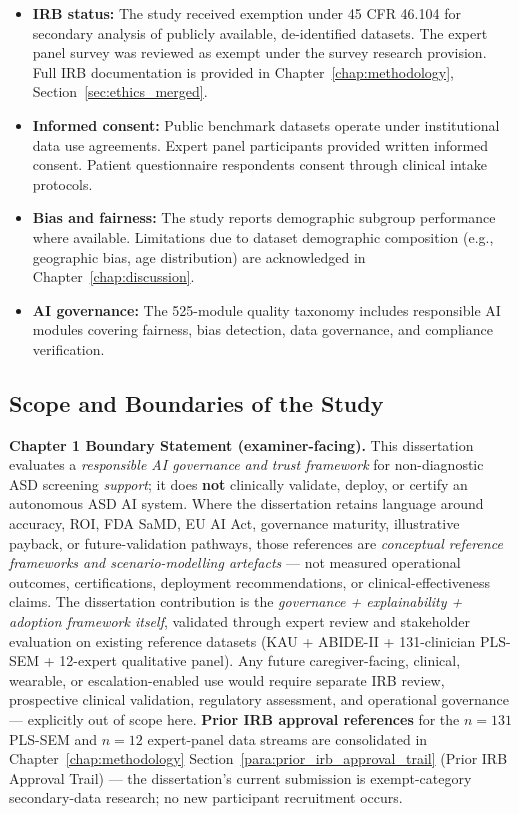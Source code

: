 \begin{itemize}[leftmargin=*, itemsep=3pt]
    \item \textbf{IRB status:} The study received exemption under 45 CFR 46.104 for secondary analysis of publicly available, de-identified datasets. The expert panel survey was reviewed as exempt under the survey research provision. Full IRB documentation is provided in Chapter~\ref{chap:methodology}, Section~\ref{sec:ethics_merged}.
    \item \textbf{Informed consent:} Public benchmark datasets operate under institutional data use agreements. Expert panel participants provided written informed consent. Patient questionnaire respondents consent through clinical intake protocols.
    \item \textbf{Bias and fairness:} The study reports demographic subgroup performance where available. Limitations due to dataset demographic composition (e.g., geographic bias, age distribution) are acknowledged in Chapter~\ref{chap:discussion}.
    \item \textbf{AI governance:} The 525-module quality taxonomy includes responsible AI modules covering fairness, bias detection, data governance, and compliance verification.
\end{itemize}

\subsection{Scope and Boundaries of the Study}
\label{sec:scope_boundaries}

\noindent\textbf{Chapter 1 Boundary Statement (examiner-facing).}
\label{para:ch1_boundary_statement}
This dissertation evaluates a \emph{responsible AI governance and trust framework} for non-diagnostic ASD screening \emph{support}; it does \textbf{not} clinically validate, deploy, or certify an autonomous ASD AI system. Where the dissertation retains language around accuracy, ROI, FDA SaMD, EU AI Act, governance maturity, illustrative payback, or future-validation pathways, those references are \emph{conceptual reference frameworks and scenario-modelling artefacts} --- not measured operational outcomes, certifications, deployment recommendations, or clinical-effectiveness claims. The dissertation contribution is the \emph{governance + explainability + adoption framework itself}, validated through expert review and stakeholder evaluation on existing reference datasets (KAU + ABIDE-II + 131-clinician PLS-SEM + 12-expert qualitative panel). Any future caregiver-facing, clinical, wearable, or escalation-enabled use would require separate IRB review, prospective clinical validation, regulatory assessment, and operational governance --- explicitly out of scope here. \textbf{Prior IRB approval references} for the $n{=}131$ PLS-SEM and $n{=}12$ expert-panel data streams are consolidated in Chapter~\ref{chap:methodology} Section~\ref{para:prior_irb_approval_trail} (Prior IRB Approval Trail) --- the dissertation's current submission is exempt-category secondary-data research; no new participant recruitment occurs.

